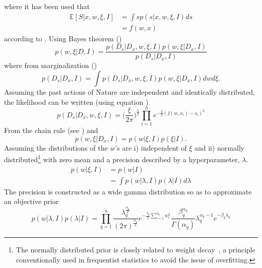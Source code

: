where it has been used that
\begin{equation}
	\begin{split}
		\mathbb{E}[S|x,w,\xi,I] &= \int s p(s|x,w,\xi,I) ds\\
		&= f(w,x)
	\end{split}
\end{equation}
according to . Using Bayes theorem ()
\begin{equation}
	p(w,\xi|D,I) = \frac{p(D_s|D_x,w,\xi,I)p(w,\xi|D_x,I)}{p(D_s|D_x,I)}
	\label{eq:bayes2}
\end{equation}
where from marginalization ()
\begin{equation}
	p(D_s|D_x,I) = \int p(D_s|D_x,w,\xi,I)p(w,\xi|D_x,I) dw d\xi.
\end{equation}
Assuming the past actions of Nature are independent and identically distributed, the likelihood can be written (using equation )
\begin{equation}
	p(D_s|D_x,w,\xi,I) = \bigg(\frac{\xi}{2\pi}\bigg)^\frac{n}{2}\prod_{i=1}^n e^{-\frac{\xi}{2}(f(w,x_i)-s_i)^2}
	\label{reg:likelihood}
\end{equation}
From the chain rule (see ) and 
\begin{equation}
	p(w,\xi|D_x,I) = p(w|\xi,I)p(\xi|I).
\end{equation}
Assuming the distributions of the $w$'s are i) independent of $\xi$ and ii) normally distributed\footnote{The normally distributed prior is closely related to weight decay~\citep{Plaut1986}, a principle conventionally used in frequentist statistics to avoid the issue of overfitting.} with zero mean and a precision described by a hyperparameter, $\lambda$. 	 
\begin{equation}
	\begin{split}
		p(w|\xi,I) & = p(w|I)\\
		& = \int p(w|\lambda,I)p(\lambda|I)d\lambda
	\end{split}
	\label{eq:prior1}
\end{equation}
The precision is constructed as a wide gamma distribution so as to approximate an objective prior
\begin{equation}
	p(w|\lambda,I)p(\lambda|I)
	= \prod_{q=1}^{\tilde{n}} \frac{\lambda_q^\frac{n_q}{2}}{(2\pi)^\frac{n_q}{2}}e^{-\frac{\lambda_q}{2}\sum_{l=1}^{n_q}w_l^2}\frac{\beta_q^{\alpha_q}}{\Gamma(\alpha_q)}\lambda_q^{\alpha_q-1}e^{-\beta_q \lambda_q}
	\label{eq:prior}
\end{equation}
